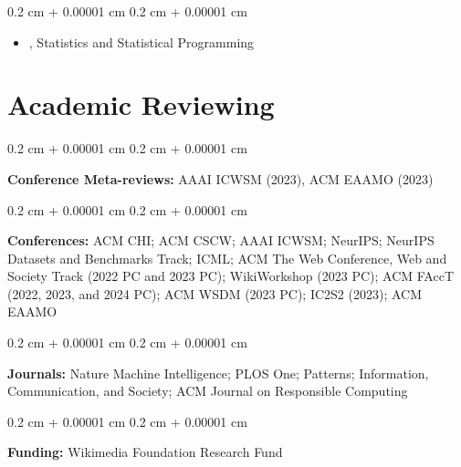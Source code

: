 \documentclass[10pt, letterpaper]{article}
\newenvironment{highlights}{
    \begin{itemize}[
        topsep=0.10 cm,
        parsep=0.10 cm,
        partopsep=0pt,
        itemsep=0pt,
        leftmargin=0.4 cm + 10pt
    ]
}{
    \end{itemize}
} %
\newenvironment{onecolentry}{
    \begin{adjustwidth}{
        0.2 cm + 0.00001 cm
    }{
        0.2 cm + 0.00001 cm
    }
}{
    \end{adjustwidth}
} %
\let\hrefWithoutArrow\href
\renewcommand{\href}[2]{\hrefWithoutArrow{#1}{\ifthenelse{\equal{#2}{}}{ }{#2 }\raisebox{.15ex}{\footnotesize \faExternalLink*}}}
\begin{document}
        \vspace{0.10 cm}
        \begin{onecolentry}
            \begin{highlights}
                \item \href{https://wiki.communitydata.science/Workshops_and_Classes}{MTS 525}, Statistics and Statistical Programming
            \end{highlights}
        \end{onecolentry}



    
    \section{Academic Reviewing}



        
        \begin{onecolentry}
            \textbf{Conference Meta-reviews:} AAAI ICWSM (2023), ACM EAAMO (2023)
        \end{onecolentry}

        \vspace{0.2 cm}

        \begin{onecolentry}
            \textbf{Conferences:} ACM CHI; ACM CSCW; AAAI ICWSM; NeurIPS; NeurIPS Datasets and Benchmarks Track; ICML; ACM The Web Conference, Web and Society Track (2022 PC and 2023 PC); WikiWorkshop (2023 PC); ACM FAccT (2022, 2023, and 2024 PC); ACM WSDM (2023 PC); IC2S2 (2023); ACM EAAMO
        \end{onecolentry}

        \vspace{0.2 cm}

        \begin{onecolentry}
            \textbf{Journals:} Nature Machine Intelligence; PLOS One; Patterns; Information, Communication, and Society; ACM Journal on Responsible Computing
        \end{onecolentry}

        \vspace{0.2 cm}

        \begin{onecolentry}
            \textbf{Funding:} Wikimedia Foundation Research Fund
        \end{onecolentry}

        \vspace{0.2 cm}
\end{document}
